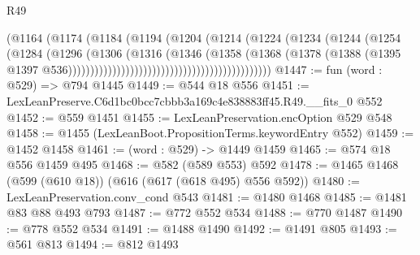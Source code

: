 \begin{lexlean}{R49}
\begin{coremodule}
                                                        (@1164
                                                          (@1174
                                                            (@1184
                                                              (@1194
                                                                (@1204
                                                                  (@1214
                                                                    (@1224
                                                                      (@1234
                                                                        (@1244
                                                                          (@1254
                                                                            (@1284
                                                                              (@1296
                                                                                (@1306
                                                                                  (@1316
                                                                                    (@1346
                                                                                      (@1358
                                                                                        (@1368
                                                                                          (@1378
                                                                                            (@1388
                                                                                              (@1395
                                                                                                @1397
                                                                                                @536))))))))))))))))))))))))))))))))))))))))))))))
@1447 := fun (word : @529) => @794 @1445
@1449 := @544 @18 @556
@1451 := LexLeanPreserve.C6d1bc0bcc7cbbb3a169c4e838883ff45.R49.__fits_0 @552
@1452 := @559 @1451
@1455 := LexLeanPreservation.encOption @529 @548
@1458 := @1455 (LexLeanBoot.PropositionTerms.keywordEntry @552)
@1459 := @1452 @1458
@1461 := (word : @529) -> @1449 @1459
@1465 := @574 @18 @556 @1459 @495
@1468 := @582 (@589 @553) @592
@1478 := @1465 @1468 (@599 (@610 @18)) (@616 (@617 (@618 @495) @556 @592))
@1480 := LexLeanPreservation.conv_cond @543
@1481 := @1480 @1468
@1485 := @1481 @83 @88 @493 @793
@1487 := @772 @552 @534
@1488 := @770 @1487
@1490 := @778 @552 @534
@1491 := @1488 @1490
@1492 := @1491 @805
@1493 := @561 @813
@1494 := @812 @1493

\end{coremodule}
\end{lexlean}
